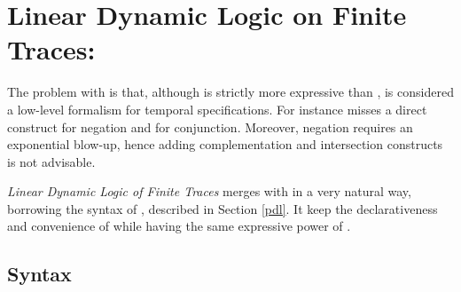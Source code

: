 \section{Linear Dynamic Logic on Finite Traces: \LDLf}
\label{sect:ldlf}
The problem with \RE is that, although is strictly more expressive than \LTLf, is considered a low-level formalism for temporal specifications. For instance \RE misses a direct construct for negation and for conjunction. Moreover, negation requires an exponential blow-up, hence adding complementation and intersection constructs is not advisable.

\emph{Linear Dynamic Logic of Finite Traces} \LDLf \citep{de2013linear} merges \LTLf with \RE in a very natural way, borrowing the syntax of \PDL, described in Section \ref{pdl}. It keep the declarativeness and convenience of \LTLf while having the same expressive power of \RE. 

\subsection{Syntax}\label{ldlf-syntax}


